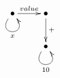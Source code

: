 $\xymatrix{
   \bullet \ar@(dl,dr)[]_{x} \ar[r]^{value} & \bullet \ar[d]^{+} \\
   & \bullet \ar@(dl,dr)[]_{10}
}$
